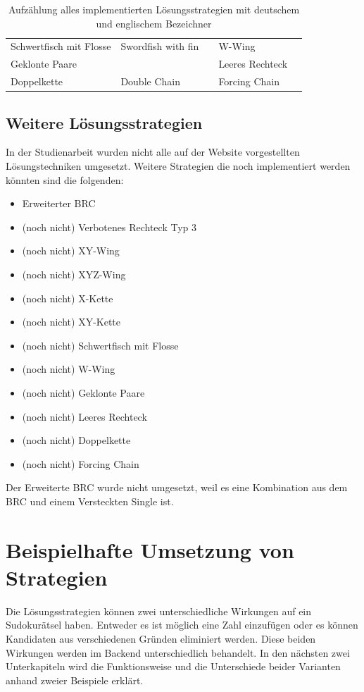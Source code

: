 \begin{table}[H]
{\begin{tabular}{lllll}
			Schwertfisch mit Flosse   & Swordfish with fin         &  & W-Wing                    &                            \\
			Geklonte Paare            &                            &  & Leeres Rechteck           &                            \\
			Doppelkette               & Double Chain               &  & Forcing Chain             &                            \\ \cline{1-2} \cline{4-5} 
		\end{tabular}%
	}
	\caption{Aufzählung alles implementierten Lösungsstrategien mit deutschem und englischem Bezeichner}
	\label{tab:implStrategien}
\end{table}

\subsection{Weitere Lösungsstrategien}
In der Studienarbeit wurden nicht alle auf der Website \cite{martin} vorgestellten Lösungstechniken umgesetzt. Weitere Strategien die noch implementiert werden könnten sind die folgenden:
\begin{itemize}
	\item Erweiterter \ac{BRC}
	\item (noch nicht) Verbotenes Rechteck Typ 3
	\item (noch nicht) XY-Wing
	\item (noch nicht) XYZ-Wing
	\item (noch nicht) X-Kette
	\item (noch nicht) XY-Kette
	\item (noch nicht) Schwertfisch mit Flosse
	\item (noch nicht) W-Wing
	\item (noch nicht) Geklonte Paare
	\item (noch nicht) Leeres Rechteck
	\item (noch nicht) Doppelkette
	\item (noch nicht) Forcing Chain
\end{itemize}
Der Erweiterte \ac{BRC} wurde nicht umgesetzt, weil es eine Kombination aus dem \ac{BRC} und einem Versteckten Single ist. 

\section{Beispielhafte Umsetzung von Strategien}
Die Lösungsstrategien können zwei unterschiedliche Wirkungen auf ein Sudokurätsel haben. Entweder es ist möglich eine Zahl einzufügen oder es können Kandidaten aus verschiedenen Gründen eliminiert werden. Diese beiden Wirkungen werden im Backend unterschiedlich behandelt. In den nächsten zwei Unterkapiteln wird die Funktionsweise und die Unterschiede beider Varianten anhand zweier Beispiele erklärt. 

